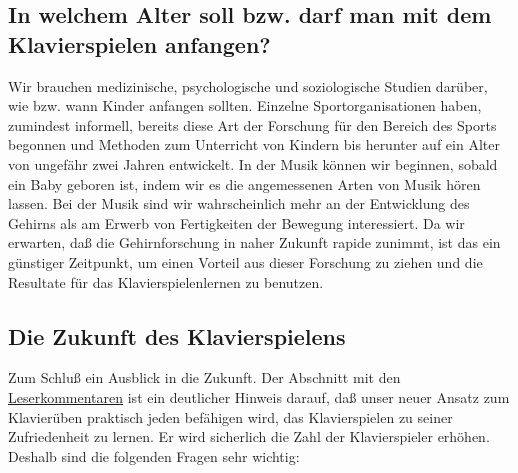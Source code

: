 \subsection{In welchem Alter soll bzw. darf man mit dem Klavierspielen anfangen?}
\label{c1iv6g}

Wir brauchen medizinische, psychologische und soziologische Studien darüber, wie bzw. wann Kinder anfangen sollten.
Einzelne Sportorganisationen haben, zumindest informell, bereits diese Art der Forschung für den Bereich des Sports begonnen und Methoden zum Unterricht von Kindern bis herunter auf ein Alter von ungefähr zwei Jahren entwickelt.
In der Musik können wir beginnen, sobald ein Baby geboren ist, indem wir es die angemessenen Arten von Musik hören lassen.
Bei der Musik sind wir wahrscheinlich mehr an der Entwicklung des Gehirns als am Erwerb von Fertigkeiten der Bewegung interessiert.
Da wir erwarten, daß die Gehirnforschung in naher Zukunft rapide zunimmt, ist das ein günstiger Zeitpunkt, um einen Vorteil aus dieser Forschung zu ziehen und die Resultate für das Klavierspielenlernen zu benutzen.


\subsection{Die Zukunft des Klavierspielens}
\label{c1iv6h}

Zum Schluß ein Ausblick in die Zukunft.
Der Abschnitt mit den \hyperref[testimonials]{Leserkommentaren} ist ein deutlicher Hinweis darauf, daß unser neuer Ansatz zum Klavierüben praktisch jeden befähigen wird, das Klavierspielen zu seiner Zufriedenheit zu lernen.
Er wird sicherlich die Zahl der Klavierspieler erhöhen.
Deshalb sind die folgenden Fragen sehr wichtig:

